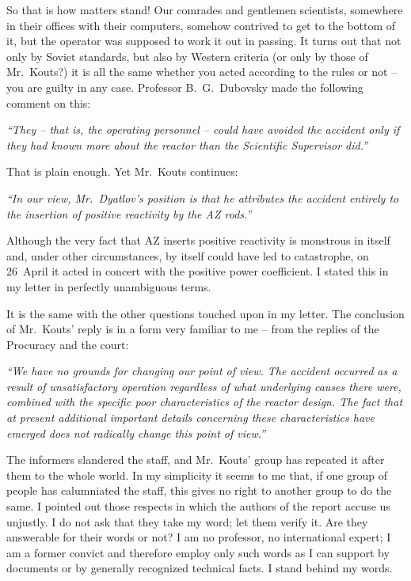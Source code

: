 \documentclass[openright]{bookest}
\begin{document}
So that is how matters stand! Our comrades and gentlemen scientists, somewhere in their offices with their computers, somehow contrived to get to the bottom of it, but the operator was supposed to work it out in passing. It turns out that not only by Soviet standards, but also by Western criteria (or only by those of Mr.~Kouts?) it is all the same whether you acted according to the rules or not -- you are guilty in any case. Professor B.~G.~Dubovsky made the following comment on this:

\begin{personal}
\textit{``They -- that is, the operating personnel -- could have avoided the accident only if they had known more about the reactor than the Scientific Supervisor did.''}
\end{personal}

That is plain enough. Yet Mr.~Kouts continues:

\begin{personal}
\textit{``In our view, Mr.~Dyatlov's position is that he attributes the accident entirely to the insertion of positive reactivity by the AZ rods.''}
\end{personal}

Although the very fact that AZ inserts positive reactivity is monstrous in itself and, under other circumstances, by itself could have led to catastrophe, on 26~April it acted in concert with the positive power coefficient. I stated this in my letter in perfectly unambiguous terms.

It is the same with the other questions touched upon in my letter. The conclusion of Mr.~Kouts' reply is in a form very familiar to me -- from the replies of the Procuracy and the court:

\begin{personal}
\textit{``We have no grounds for changing our point of view. The accident occurred as a result of unsatisfactory operation regardless of what underlying causes there were, combined with the specific poor characteristics of the reactor design. The fact that at present additional important details concerning these characteristics have emerged does not radically change this point of view.''}
\end{personal}

The informers slandered the staff, and Mr.~Kouts' group has repeated it after them to the whole world. In my simplicity it seems to me that, if one group of people has calumniated the staff, this gives no right to another group to do the same. I pointed out those respects in which the authors of the report accuse us unjustly. I do not ask that they take my word; let them verify it. Are they answerable for their words or not? I am no professor, no international expert; I am a former convict and therefore employ only such words as I can support by documents or by generally recognized technical facts. I stand behind my words.
\end{document}
